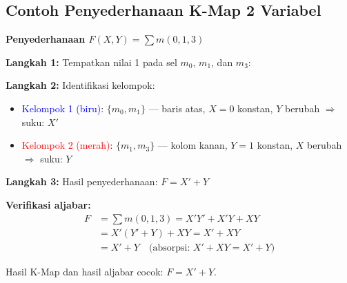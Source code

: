 \subsection{Contoh Penyederhanaan K-Map 2 Variabel}

\begin{contoh}
\textbf{Penyederhanaan $F(X,Y) = \sum m(0, 1, 3)$}

\textbf{Langkah 1:} Tempatkan nilai 1 pada sel $m_0$, $m_1$, dan $m_3$:

\begin{center}
\end{center}

\textbf{Langkah 2:} Identifikasi kelompok:
\begin{itemize}
    \item \textcolor{blue}{Kelompok 1 (biru)}: $\{m_0, m_1\}$ --- baris atas, $X = 0$ konstan, $Y$ berubah $\Rightarrow$ suku: $X'$
    \item \textcolor{red}{Kelompok 2 (merah)}: $\{m_1, m_3\}$ --- kolom kanan, $Y = 1$ konstan, $X$ berubah $\Rightarrow$ suku: $Y$
\end{itemize}

\textbf{Langkah 3:} Hasil penyederhanaan: $F = X' + Y$

\textbf{Verifikasi aljabar:}
\begin{align*}
F &= \sum m(0, 1, 3) = X'Y' + X'Y + XY \\
  &= X'(Y' + Y) + XY = X' + XY \\
  &= X' + Y \quad \text{(absorpsi: } X' + XY = X' + Y)
\end{align*}

Hasil K-Map dan hasil aljabar cocok: $F = X' + Y$.
\end{contoh}
